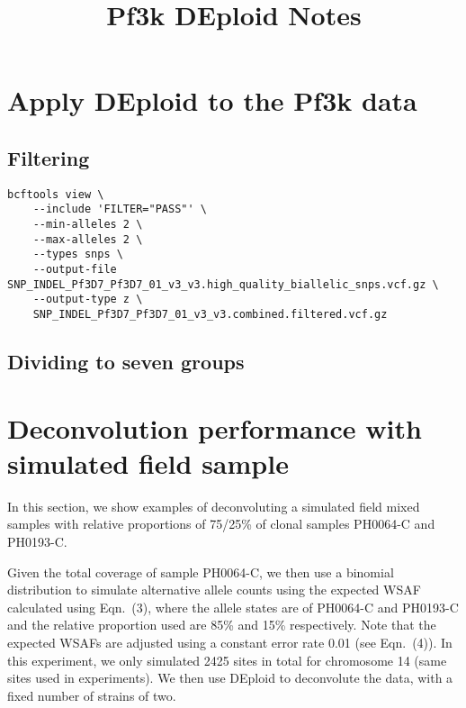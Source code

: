 \documentclass{article}
\title{Pf3k DEploid Notes}
\author{ }
\date{}
\begin{document}
\maketitle



\section{Apply DEploid to the Pf3k data}
\subsection{Filtering}

\linespread{1}
\begin{lstlisting}
bcftools view \
    --include 'FILTER="PASS"' \
    --min-alleles 2 \
    --max-alleles 2 \
    --types snps \
    --output-file SNP_INDEL_Pf3D7_Pf3D7_01_v3_v3.high_quality_biallelic_snps.vcf.gz \
    --output-type z \
    SNP_INDEL_Pf3D7_Pf3D7_01_v3_v3.combined.filtered.vcf.gz
\end{lstlisting}
\linespread{1.5}

\subsection{Dividing to seven groups}



\section{Deconvolution performance with simulated field sample}


In this section, we show examples of deconvoluting a simulated field mixed samples with relative proportions of 75/25\% of clonal samples {\textmd PH0064-C} and {\textmd PH0193-C}.

Given the total coverage of sample {\textmd PH0064-C}, we then use a binomial distribution to simulate alternative allele counts using the expected WSAF calculated using \citet{Zhu2017} Eqn.~(3), where the allele states are of {\textmd PH0064-C} and {\textmd PH0193-C} and the relative proportion used are 85\% and 15\% respectively. Note that the expected WSAFs are adjusted using a constant error rate 0.01 (see Eqn.~(4)). In this experiment, we only simulated 2425 sites in total for chromosome 14 (same sites used in \citet{Zhu2017} experiments). We then use DEploid to deconvolute the data, with a fixed number of strains of two.
\end{document}
